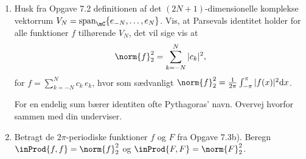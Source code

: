 \begin{opg}\hfill
\begin{enumerate}
	\item Husk fra Opgave 7.2 definitionen af det $(2N+1)$-dimensionelle komplekse vektorrum $V_N = \text{span}_\mC\{e_{-N}, \ldots, e_N\}$. Vis, at Parsevals identitet holder for alle funktioner $f$ tilhørende $V_N$, det vil sige vis at
	$$ \norm{f}_2^2 = \sum_{k=-N}^N |c_k|^2, $$
    for $f=\sum_{k=-N}^N c_k \, e_k$, hvor som sædvanligt $\norm{f}_2^2  =	\frac{1}{2\pi}\int_{-\pi}^{\pi} |f(x)|^2 \mathrm{d} x$.
	
	For en endelig sum bærer identiten ofte Pythagoras' navn. Overvej hvorfor sammen med din underviser.
        
	\iffalse\begin{proof}[Løsning]
	Ved direkte beregning fås
	\begin{align*}
	    \norm{f}_2^2 = \frac{1}{2\pi}\int_{-\pi}^\pi \abs{f\pare{x}}^2 \, dx
	        &=\frac{1}{2\pi}\int_{-\pi}^\pi \pare{\sum_{k=-N}^N c_ke_k\pare{x}}
	            \pare{\sum_{l=-N}^N\overline{c_le_l\pare{x}}}\,dx \\
	       &=\sum_{k,l=-N}^N c_k\overline{c_l} \frac{1}{2\pi}\int_{-\pi}^\pi
	            e^{ikx}e^{-ilx} \, dx
	       = \sum_{k,l=-N}^N c_k\overline{c_l} \delta_{k,l}
	       = \sum_{k=-N}^N \abs{c_k}^2
	\end{align*}
	\end{proof}\fi
	
	\item Betragt de $2\pi$-periodiske funktioner $f$ og $F$ fra Opgave 7.3b).	Beregn $\inProd{f,f}=\norm{f}_2^2$ og $\inProd{F,F}= \norm{F}_2^2$.
	
	\iffalse\begin{proof}[Løsning]
	Ved direkte beregning fås
	$$ \norm{f}_2^2 = \frac{1}{2\pi}\int_{-\pi}^\pi \abs{f\pare{x}}^2 \, dx
                = \frac{1}{2\pi}\int_{-\pi}^0 \pare{\frac{-x-\pi}{2}}^2 \, dx
                    + \frac{1}{2\pi}\int_0^\pi \pare{\frac{x-\pi}{2}}^2 \, dx
                = \frac{\pi^2}{12} $$
    og 
    \begin{align*}
        \norm{F}_2^2 = \frac{1}{2\pi}\int_{-\pi}^\pi \abs{F\pare{x}}^2 \, dx
                &= \frac{1}{2\pi}\int_{-\pi}^0\pare{\frac{\pi^2}{12}     - \frac{1}{4}\pare{x+\pi}^2}^2 \, dx
                    + \frac{1}{2\pi}\int_0^\pi
                    \pare{\frac{\pi^2}{12}-\frac{1}{4}\pare{x-\pi}^2}^2\,dx
                = \frac{\pi^4}{180}
    \end{align*}
    \end{proof}\fi
	

\end{enumerate}
\end{opg}
